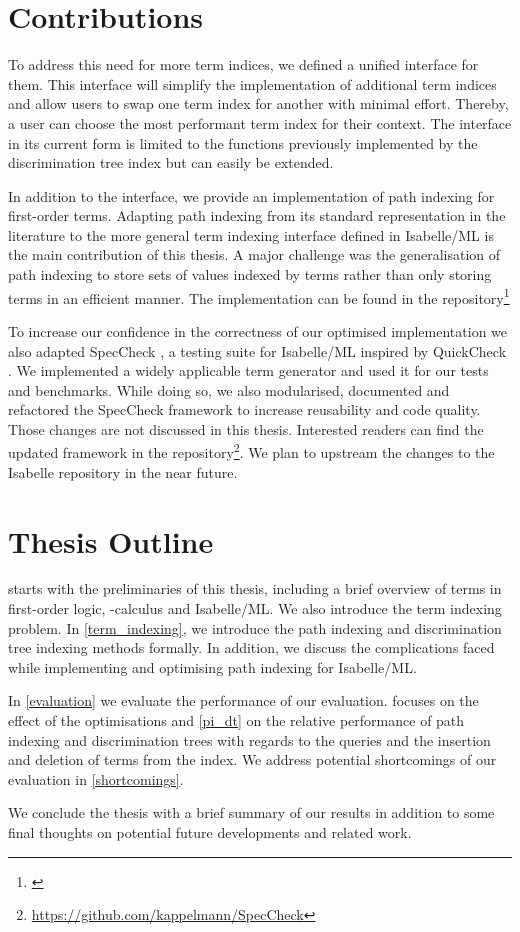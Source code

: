 \section{Contributions}
To address this need for more term indices, we defined a unified interface for them. This interface will simplify the implementation of additional term indices and allow users to swap one term index for another with minimal effort. Thereby, a user can choose the most performant term index for their context.
The interface in its current form is limited to the functions previously implemented by the discrimination tree index but can easily be extended.

In addition to the interface, we provide an implementation of path indexing for first-order terms. Adapting path indexing from its standard representation in the literature to the more general term indexing interface defined in Isabelle/ML is the main contribution of this thesis.
A major challenge was the generalisation of path indexing to store sets of values indexed by terms rather than only storing terms in an efficient manner. The implementation can be found in the repository\footnote{\url{}}

To increase our confidence in the correctness of our optimised implementation we also adapted SpecCheck \cite{bulwahn_new_2012}, a testing suite for Isabelle/ML inspired by QuickCheck \cite{claessen_quickcheck_2011}.
We implemented a widely applicable term generator and used it for our tests and benchmarks.
While doing so, we also modularised, documented and refactored the SpecCheck framework to increase reusability and code quality.
Those changes are not discussed in this thesis.
Interested readers can find the updated framework in the repository\footnote{\url{https://github.com/kappelmann/SpecCheck}}.
We plan to upstream the changes to the Isabelle repository in the near future.

\section{Thesis Outline}
 starts with the preliminaries of this thesis, including a brief overview of terms in first-order logic, \lam -calculus and Isabelle/ML. We also introduce the term indexing problem. In \cref{term_indexing}, we introduce the path indexing and discrimination tree indexing methods formally. In addition, we discuss the complications faced while implementing and optimising path indexing for Isabelle/ML.

In \cref{evaluation} we evaluate the performance of our evaluation.  focuses on the effect of the optimisations and \cref{pi_dt} on the relative performance of path indexing and discrimination trees with regards to the queries and the insertion and deletion of terms from the index. We address potential shortcomings of our evaluation in \cref{shortcomings}.

We conclude the thesis with a brief summary of our results in addition to some final thoughts on potential future developments and related work.
